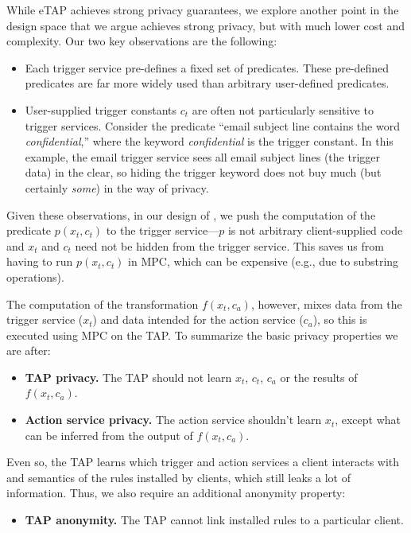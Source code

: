 While \textsf{eTAP} achieves strong privacy guarantees, we explore another point
in the design space that we argue achieves strong privacy, but with much lower
cost and complexity. Our two key observations are the following:
\begin{itemize}
  \item Each trigger service pre-defines a fixed set of predicates. These
    pre-defined predicates are far more widely used than arbitrary user-defined
    predicates.
  \item User-supplied trigger constants $c_t$ are often not particularly
    sensitive to trigger services. Consider the predicate ``email subject line
    contains the word \emph{confidential},'' where the keyword
    \emph{confidential} is the trigger constant. In this example, the email
    trigger service sees all email subject lines (the trigger data) in the
    clear, so hiding the trigger keyword does not buy much (but certainly
    \emph{some}) in the way of privacy.
\end{itemize}
Given these observations, in our design of \sys, we push the computation of the
predicate $p(x_t, c_t)$ to the trigger service---$p$ is not arbitrary
client-supplied code and $x_t$ and $c_t$ need not be hidden from the trigger
service. This saves us from having to run $p(x_t, c_t)$ in MPC, which can be
expensive (e.g., due to substring operations).

The computation of the transformation $f(x_t, c_a)$, however, mixes data from
the trigger service ($x_t$) and data intended for the action service ($c_a$), so
this is executed using MPC on the TAP. To summarize the basic privacy properties
we are after:
\begin{itemize}
  \item \textbf{TAP privacy.} The TAP should not learn $x_t$, $c_t$, $c_a$ or
    the results of $f(x_t, c_a)$.
  \item \textbf{Action service privacy.} The action service shouldn't learn
    $x_t$, except what can be inferred from the output of $f(x_t, c_a)$.
\end{itemize}
Even so, the TAP learns which trigger and action services a client interacts
with and semantics of the rules installed by clients, which still leaks a lot of
information.  Thus, we also require an additional anonymity property:
\begin{itemize}
  \item \textbf{TAP anonymity.} The TAP cannot link installed rules to a
    particular client.
\end{itemize}

